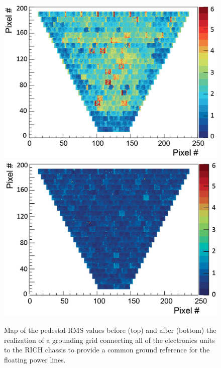 \documentclass[5p,times,twocolumn]{elsarticle}
\begin{document}
\begin{figure}[t]
\begin{center}
\includegraphics[width=1.0\columnwidth]{pedestal_rms_before.png}
\includegraphics[width=1.0\columnwidth]{pedestal_rms_after.png}
\end{center}
\caption{Map of the pedestal RMS values before (top) and after (bottom) the realization of a grounding grid
  connecting all of the electronics units to the RICH chassis to provide a common ground reference for the floating
  power lines.}
\label{fig:GroundG}
\end{figure}
\end{document}
